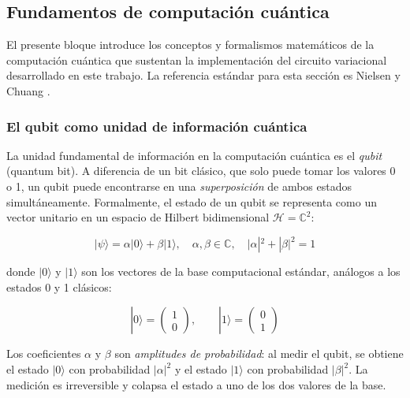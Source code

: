 
\subsection{Fundamentos de computación cuántica}

El presente bloque introduce los conceptos y formalismos matemáticos de la computación cuántica que sustentan la implementación del circuito variacional desarrollado en este trabajo. La referencia estándar para esta sección es Nielsen y Chuang \cite{nielsen2010quantum}.

\subsubsection{El qubit como unidad de información cuántica}

La unidad fundamental de información en la computación cuántica es el \textit{qubit} (quantum bit). A diferencia de un bit clásico, que solo puede tomar los valores 0 o 1, un qubit puede encontrarse en una \textit{superposición} de ambos estados simultáneamente. Formalmente, el estado de un qubit se representa como un vector unitario en un espacio de Hilbert bidimensional $\mathcal{H} = \mathbb{C}^2$:

\begin{equation}
    |\psi\rangle = \alpha|0\rangle + \beta|1\rangle, 
    \quad \alpha, \beta \in \mathbb{C}, 
    \quad |\alpha|^2 + |\beta|^2 = 1
    \label{eq:qubit}
\end{equation}

\noindent donde $|0\rangle$ y $|1\rangle$ son los vectores de la base computacional estándar, análogos a los estados 0 y 1 clásicos:

\begin{equation}
    |0\rangle = \begin{pmatrix} 1 \\ 0 \end{pmatrix}, \qquad
    |1\rangle = \begin{pmatrix} 0 \\ 1 \end{pmatrix}
    \label{eq:basis}
\end{equation}

\noindent Los coeficientes $\alpha$ y $\beta$ son \textit{amplitudes de probabilidad}: al medir el qubit, se obtiene el estado $|0\rangle$ con probabilidad $|\alpha|^2$ y el estado $|1\rangle$ con probabilidad $|\beta|^2$. La medición es irreversible y colapsa el estado a uno de los dos valores de la base.

